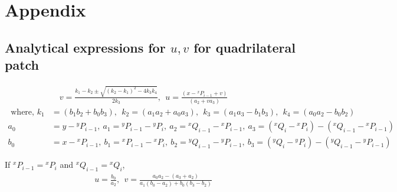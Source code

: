 \documentclass[12pt,a4]{article}
\begin{document}
\section{Appendix}	
\subsection{Analytical expressions for $u,v$ for quadrilateral patch}\label{app:Analylit_u_v_quad}
\begin{align}
&\quad {v} = \frac{k_1-k_2\pm \sqrt{\left(k_2-k_1\right)^2-4k_3k_4}}{2k_3},~~{u} = \frac{\left(x-{}^xP_{i-1}+{v}\right)}{\left( a_2+{v} a_3 \right)}\\
\nonumber\text{ where, }k_1 &= \left(b_1b_2+b_0b_3 \right),~~k_2 = \left(a_1a_2+a_0a_3 \right),~~
k_3 = \left(a_1a_3-b_1b_3 \right),~~k_4=\left(a_0a_2-b_0b_2 \right)\\
\nonumber a_0 &= y-{}^yP_{i-1},~a_1 = {}^yP_{i-1}-{}^yP_i,~a_2 = {}^xQ_{i-1}-{}^xP_{i-1},~a_3 = \left({}^xQ_{i}-{}^xP_i\right)-\left({}^xQ_{i-1}-{}^xP_{i-1}\right)\\
\nonumber b_0 &= x-{}^xP_{i-1},~b_1 = {}^xP_{i-1}-{}^xP_i,~b_2 = {}^yQ_{i-1}-{}^yP_{i-1},~b_3 = \left({}^yQ_{i}-{}^yP_i\right)-\left({}^yQ_{i-1}-{}^yP_{i-1}\right)
\end{align}

If ${}^xP_{i-1}={}^xP_{i}$ and ${}^xQ_{i-1}={}^xQ_{i}$, 
\begin{align}
{u} = \frac{b_0}{a_2},~~{v} = \frac{a_0a_2-\left(a_3+a_2 \right)}{a_1\left(b_0-a_2\right)+b_0\left(b_3-b_2 \right)}
\end{align}
\end{document}
